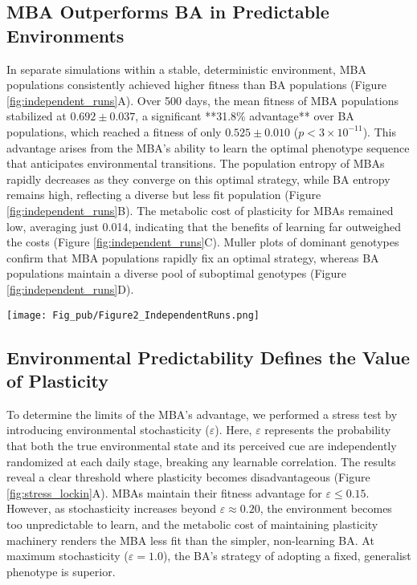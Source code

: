 \documentclass[aps,pre,twocolumn,floatfix,nofootinbib,amsmath,amssymb]{revtex4-2}
\begin{document}
\subsection{MBA Outperforms BA in Predictable Environments}
In separate simulations within a stable, deterministic environment, MBA populations consistently achieved higher fitness than BA populations (Figure \ref{fig:independent_runs}A). Over 500 days, the mean fitness of MBA populations stabilized at \(0.692 \pm 0.037\), a significant **31.8\% advantage** over BA populations, which reached a fitness of only \(0.525 \pm 0.010\) (\(p < 3 \times 10^{-11}\)). This advantage arises from the MBA's ability to learn the optimal phenotype sequence that anticipates environmental transitions. The population entropy of MBAs rapidly decreases as they converge on this optimal strategy, while BA entropy remains high, reflecting a diverse but less fit population (Figure \ref{fig:independent_runs}B). The metabolic cost of plasticity for MBAs remained low, averaging just 0.014, indicating that the benefits of learning far outweighed the costs (Figure \ref{fig:independent_runs}C). Muller plots of dominant genotypes confirm that MBA populations rapidly fix an optimal strategy, whereas BA populations maintain a diverse pool of suboptimal genotypes (Figure \ref{fig:independent_runs}D).

\begin{figure*}[t]
    \centering
    \texttt{[image: Fig\_pub/Figure2\_IndependentRuns.png]}
    \caption{\textbf{Independent Population Dynamics.} Comparison of BA-only and MBA-only populations over 500 days (mean \(\pm\) SEM over 10 replicates). \textbf{A)} MBA agents achieve significantly higher mean fitness. \textbf{B)} MBA population entropy drops as agents converge on an optimal strategy, while BA entropy remains high. \textbf{C)} The metabolic cost of plasticity for MBAs is minimal. \textbf{D)} Muller plots show the rapid fixation of a dominant, optimal genotype in MBA populations (bottom), while BA populations (top) fail to converge.}
    \label{fig:independent_runs}
\end{figure*}

\subsection{Environmental Predictability Defines the Value of Plasticity}
To determine the limits of the MBA's advantage, we performed a stress test by introducing environmental stochasticity (\(\varepsilon\)). Here, \(\varepsilon\) represents the probability that both the true environmental state and its perceived cue are independently randomized at each daily stage, breaking any learnable correlation. The results reveal a clear threshold where plasticity becomes disadvantageous (Figure \ref{fig:stress_lockin}A). MBAs maintain their fitness advantage for \(\varepsilon \le 0.15\). However, as stochasticity increases beyond \(\varepsilon \approx 0.20\), the environment becomes too unpredictable to learn, and the metabolic cost of maintaining plasticity machinery renders the MBA less fit than the simpler, non-learning BA. At maximum stochasticity (\(\varepsilon = 1.0\)), the BA's strategy of adopting a fixed, generalist phenotype is superior.
\end{document}

